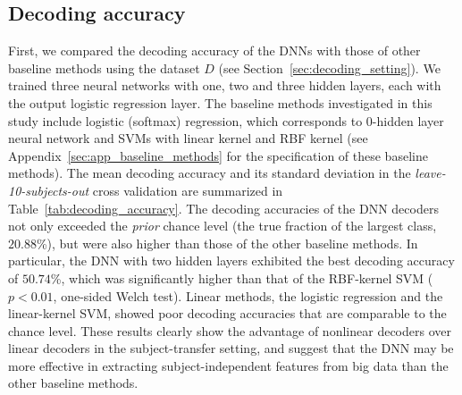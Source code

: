 \subsection{Decoding accuracy}
\label{sec:decoding_accuracy}
First, we compared the decoding accuracy of the DNNs with those of other baseline methods using the dataset $D$ (see Section~\ref{sec:decoding_setting}).
We trained three neural networks with one, two and three hidden layers, each with the output logistic regression layer.
%
The baseline methods investigated in this study
include logistic (softmax) regression, which corresponds to 0-hidden layer neural network and SVMs with linear kernel and RBF kernel (see Appendix~\ref{sec:app_baseline_methods} for the specification of these baseline methods).
The mean decoding accuracy and its standard deviation in the \textit{leave-10-subjects-out} cross validation are summarized in Table~\ref{tab:decoding_accuracy}.
%
The decoding accuracies of the DNN decoders not only exceeded the \textit{prior} chance level (the true fraction of the largest class, $20.88$\%), but were also higher than those of the other baseline methods.
%
In particular, the DNN with two hidden layers exhibited the best decoding accuracy of $50.74$\%, which was  significantly higher than that of the RBF-kernel SVM ($p < 0.01 $, one-sided Welch test).
%
Linear methods, the logistic regression and the linear-kernel SVM,
showed poor decoding accuracies that are comparable to the chance level.
%
These results clearly show the advantage of nonlinear decoders over linear decoders in the subject-transfer setting, and suggest that the DNN may be more effective in extracting subject-independent features from big data than the other baseline methods.
%
